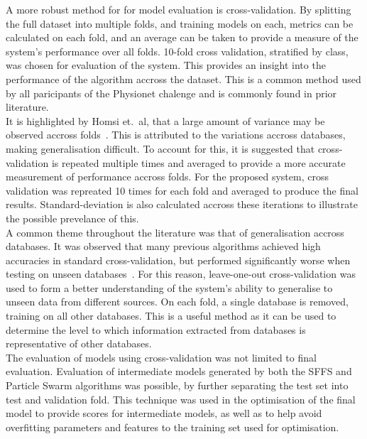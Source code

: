 \documentclass[titlepage, 12pt]{scrartcl} \usepackage{enumitem}
\begin{document}
A more robust method for for model evaluation is cross-validation. By splitting
the full dataset into multiple folds, and training models on each, metrics can
be calculated on each fold, and an average can be taken to provide a measure of
the system's performance over all folds. 10-fold cross validation, stratified
by class, was chosen for evaluation of the system. This provides an insight
into the performance of the algorithm accross the dataset. This is a common
method used by all paricipants of the Physionet chalenge and is commonly found
in prior literature.\\
It is highlighted by Homsi et.\ al, that a large amount of variance may be
observed accross folds~\parencite[p.1637]{Homsi2017}. This is attributed to the
variations accross databases, making generalisation difficult. To account for
this, it is suggested that cross-validation is repeated multiple times and
averaged to provide a more accurate measurement of performance accross folds.
For the proposed system, cross validation was repreated 10 times for each fold
and averaged to produce the final results. Standard-deviation is also
calculated accross these iterations to illustrate the possible prevelance of
this.\\

A common theme throughout the literature was that of generalisation accross
databases. It was observed that many previous algorithms achieved high
accuracies in standard cross-validation, but performed significantly worse when
testing on unseen databases~\parencite{Homsi2017, Bobillo2016}. For this
reason, leave-one-out cross-validation was used to form a better understanding
of the system's ability to generalise to unseen data from different sources. On
each fold, a single database is removed, training on all other databases. This
is a useful method as it can be used to determine the level to which
information extracted from databases is representative of other databases.\\

The evaluation of models using cross-validation was not limited to final
evaluation. Evaluation of intermediate models generated by both the SFFS and Particle Swarm
algorithms was possible, by further separating the test set into test and
validation fold. This technique was used in the optimisation of the
final model to provide scores for intermediate models, as well as to help avoid
overfitting parameters and features to the training set used for
optimisation.\\
\end{document}
